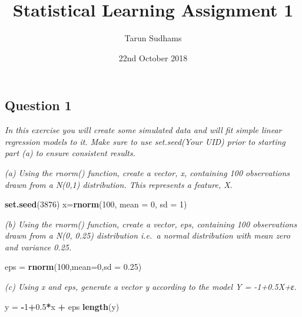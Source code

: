 \documentclass[]{article}
\title{Statistical Learning Assignment 1}
\author{Tarun Sudhams}
\date{22nd October 2018}
\newenvironment{Shaded}{\begin{snugshade}}{\end{snugshade}}
\newcommand{\KeywordTok}[1]{\textcolor[rgb]{0.13,0.29,0.53}{\textbf{#1}}}
\newcommand{\DataTypeTok}[1]{\textcolor[rgb]{0.13,0.29,0.53}{#1}}
\newcommand{\DecValTok}[1]{\textcolor[rgb]{0.00,0.00,0.81}{#1}}
\newcommand{\FloatTok}[1]{\textcolor[rgb]{0.00,0.00,0.81}{#1}}
\newcommand{\StringTok}[1]{\textcolor[rgb]{0.31,0.60,0.02}{#1}}
\newcommand{\OperatorTok}[1]{\textcolor[rgb]{0.81,0.36,0.00}{\textbf{#1}}}
\newcommand{\NormalTok}[1]{#1}
\begin{document}
\maketitle

\subsection{Question 1}\label{question-1}

\emph{In this exercise you will create some simulated data and will fit
simple linear regression models to it. Make sure to use set.seed(Your
UID) prior to starting part (a) to ensure consistent results.}

\emph{(a) Using the rnorm() function, create a vector, x, containing 100
observations drawn from a N(0,1) distribution. This represents a
feature, X.}

\begin{Shaded}
\begin{Highlighting}[]
\KeywordTok{set.seed}\NormalTok{(}\DecValTok{3876}\NormalTok{)}
\NormalTok{x=}\KeywordTok{rnorm}\NormalTok{(}\DecValTok{100}\NormalTok{, }\DataTypeTok{mean =} \DecValTok{0}\NormalTok{, }\DataTypeTok{sd =} \DecValTok{1}\NormalTok{)}
\end{Highlighting}
\end{Shaded}

 \emph{(b) Using the rnorm() function, create a vector, eps, containing
100 observations drawn from a N(0, 0.25) distribution i.e.~a normal
distribution with mean zero and variance 0.25.}

\begin{Shaded}
\begin{Highlighting}[]
\NormalTok{eps =}\StringTok{ }\KeywordTok{rnorm}\NormalTok{(}\DecValTok{100}\NormalTok{,}\DataTypeTok{mean=}\DecValTok{0}\NormalTok{,}\DataTypeTok{sd =} \FloatTok{0.25}\NormalTok{)}
\end{Highlighting}
\end{Shaded}

 \emph{(c) Using x and eps, generate a vector y according to the model Y
= -1+0.5X+ε.}

\begin{Shaded}
\begin{Highlighting}[]
\NormalTok{y =}\StringTok{ }\OperatorTok{-}\DecValTok{1}\OperatorTok{+}\FloatTok{0.5}\OperatorTok{*}\NormalTok{x }\OperatorTok{+}\StringTok{ }\NormalTok{eps}
\KeywordTok{length}\NormalTok{(y)}
\end{Highlighting}
\end{Shaded}
\end{document}
